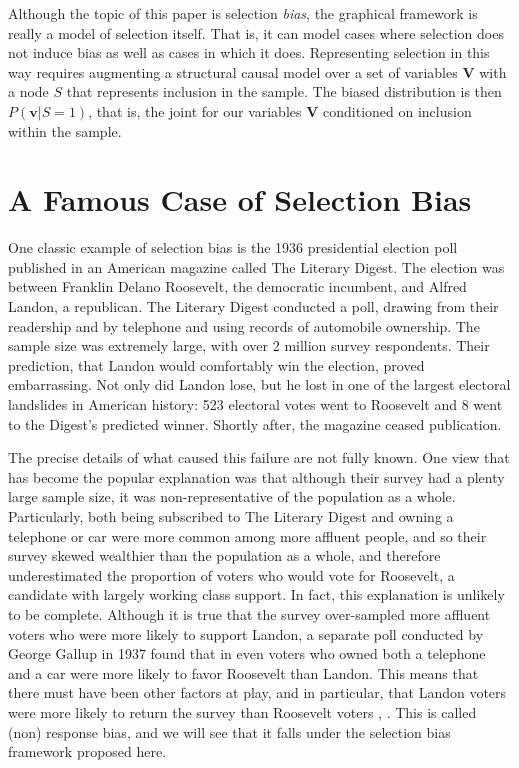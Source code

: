 \documentclass[12pt,twoside]{reedthesis}
\theoremstyle{definition}
\begin{document}
Although the topic of this paper is selection \emph{bias}, the graphical framework is really a model of selection itself. That is, it can model cases where selection does not induce bias as well as cases in which it does. Representing selection in this way requires augmenting  a structural causal model over a set of variables $\mathbf{V}$ with a node $S$ that represents inclusion in the sample. The biased distribution is then $P(\mathbf{v} | S = 1)$, that is, the joint for our variables $\mathbf{V}$ conditioned on inclusion within the sample.  

\section{A Famous Case of Selection Bias}
One classic example of selection bias is the 1936 presidential election poll  published in an American magazine called The Literary Digest. The election was between Franklin Delano Roosevelt, the democratic incumbent, and Alfred Landon, a republican. The Literary Digest conducted a poll, drawing from their readership and by telephone and using records of automobile ownership. The sample size was extremely large, with over 2 million survey respondents. Their prediction, that Landon would comfortably win the election, proved embarrassing. Not only did Landon lose, but he lost in one of the largest electoral landslides in American history:  523 electoral votes went to Roosevelt and 8 went to the Digest's predicted winner. Shortly after, the magazine ceased publication.

The precise details of what caused this failure are not fully known. One view that has become the popular explanation was that although their survey had a plenty large sample size, it was non-representative of the population as a whole. Particularly, both being subscribed to The Literary Digest and owning a telephone or car were more common among more affluent people, and so their survey skewed wealthier than the population as a whole, and therefore underestimated the proportion of voters who would vote for Roosevelt, a candidate with largely working class support. In fact, this explanation is unlikely to be complete. Although it is true that the survey over-sampled more affluent voters who were more likely to support Landon, a separate poll  conducted by George Gallup in 1937 found that in even voters who owned both a telephone and a car were more likely to favor Roosevelt than Landon. This means that there must have been other factors at play, and in particular, that Landon voters were more likely to return the survey than Roosevelt voters \citep{Squire1988}, \cite{lusinchi_2012}. This is called (non) response bias, and we will see that it falls under the selection bias framework proposed here.
\end{document}
